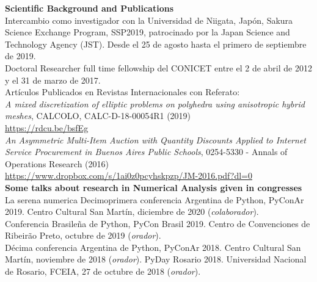 \textbf{Scientific Background and Publications}\\[6pt]
Intercambio como investigador con la Universidad de Niigata, Jap\'on,
Sakura Science Exchange Program, SSP2019, patrocinado por
la Japan Science and Technology Agency (JST). Desde el 25 de agosto
hasta el primero de septiembre de 2019.\\[6pt]
Doctoral Researcher full time
fellowship del CONICET entre el 2 de abril de 2012 y el 31 de marzo de 2017.\\[6pt]
Art\'iculos Publicados en Revistas Internacionales con Referato:\\[6pt]
\emph{A mixed discretization of elliptic problems on polyhedra using anisotropic hybrid meshes},
CALCOLO, CALC-D-18-00054R1 (2019)\\
\href{http://em.rdcu.be/wf/click?upn=lMZy1lernSJ7apc5DgYM8RtiRnX98cgbvE81KQGn5tE-3D_-2Fq09Vpjrycd-2BAOhvYDidHaHWLaG8WMoWs1lRs2mKTzqCwYNFhlGtplH8kb8yUCOrEFESCWAEP1qrD-2BJgg09nu-2Fz61XDXWYdppeXx4JzFRLvI-2FYyjZMrov-2FaxFxLv9MaqfC-2BjYanB-2FkLIArphbTB7hvuq-2BJ-2BP0dpoVrgh2NJYizQcMbyo6AA8jcx6RYsWvb3RMk9c7QXTqmoLaHKr8Xg6yK2lC1IxrYwuPPxXUxfxXQc0WAqTO-2Bg-2F9P-2BWkhJXyogoqkg5GNjl1KqQhJV5xi014g-3D-3D}{\color{blue}https://rdcu.be/bsfEg}
\\[4pt]
\emph{An Asymmetric Multi-Item Auction with Quantity Discounts Applied to Internet 
Service Procurement in Buenos Aires Public Schools}, 
0254-5330 - Annals of Operations Research (2016)\\
\href{https://www.dropbox.com/s/1ai0z0pcyhskpzp/JM-2016.pdf?dl=0}{\color{blue}https://www.dropbox.com/s/1ai0z0pcyhskpzp/JM-2016.pdf?dl=0}\\[6pt]

\textbf{Some talks about research in Numerical Analysis given in congresses}\\[6pt]
La serena numerica
Decimoprimera conferencia Argentina de Python, PyConAr 2019. Centro Cultural San Mart\'in,
diciembre de 2020 (\emph{colaborador}).\\[4pt]
Conferencia Brasile\~na de Python, PyCon Brasil 2019. Centro de Convenciones de
Ribeir\~ao Preto, octubre de 2019 (\emph{orador}).\\[4pt]
D\'ecima conferencia Argentina de Python, PyConAr 2018.
Centro Cultural San Mart\'in, noviembre de 2018 (\emph{orador}).
PyDay Rosario 2018. Universidad Nacional de Rosario, FCEIA, 27 de octubre
de 2018 (\emph{orador}).

